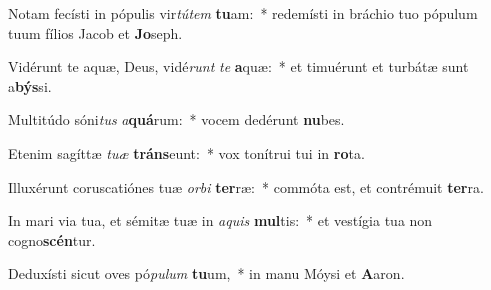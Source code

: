 \item Notam fecísti in pópulis vir\textit{tú}\textit{tem} \textbf{tu}am:~* redemísti in bráchio tuo pópulum tuum fílios Jacob et \textbf{Jo}seph.
\item Vidérunt te aquæ, Deus, vidé\textit{runt} \textit{te} \textbf{a}quæ:~* et timuérunt et turbátæ sunt a\textbf{býs}si.
\item Multitúdo sóni\textit{tus} \textit{a}\textbf{quá}rum:~* vocem dedérunt \textbf{nu}bes.
\item Etenim sagíttæ \textit{tu}\textit{æ} \textbf{tráns}eunt:~* vox tonítrui tui in \textbf{ro}ta.
\item Illuxérunt coruscatiónes tuæ \textit{or}\textit{bi} \textbf{ter}ræ:~* commóta est, et contrémuit \textbf{ter}ra.
\item In mari via tua, et sémitæ tuæ in \textit{a}\textit{quis} \textbf{mul}tis:~* et vestígia tua non cogno\textbf{scén}tur.
\item Deduxísti sicut oves pó\textit{pu}\textit{lum} \textbf{tu}um,~* in manu Móysi et \textbf{A}aron.
